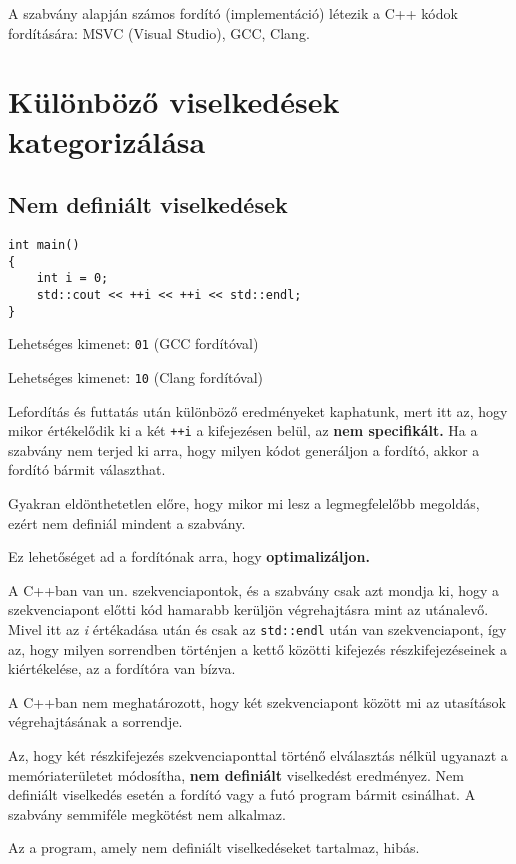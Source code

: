 \documentclass[a4paper,11.5pt]{article}
\begin{document}
	\medskip
  A szabvány alapján számos fordító (implementáció) létezik a C++ kódok fordítására: MSVC (Visual Studio), GCC, Clang.
  \section{Különböző viselkedések kategorizálása} 
	\subsection{Nem definiált viselkedések}
	\begin{lstlisting}
int main()
{
	int i = 0;
	std::cout << ++i << ++i << std::endl;
}
	\end{lstlisting}
	Lehetséges kimenet: \texttt{01} (GCC fordítóval)
	
	Lehetséges kimenet: \texttt{10} (Clang fordítóval)
	\medskip
	
	Lefordítás és futtatás után különböző eredményeket kaphatunk, mert itt az, hogy mikor értékelődik ki a két \texttt{++i} a kifejezésen belül, az \textbf{nem specifikált.} Ha a szabvány nem terjed ki arra, hogy milyen kódot generáljon a fordító, akkor a fordító bármit választhat. 
	\medskip
	
	Gyakran eldönthetetlen előre, hogy mikor mi lesz a legmegfelelőbb megoldás, ezért nem definiál mindent a szabvány.
	\medskip
	
	Ez lehetőséget ad a fordítónak arra, hogy \textbf{optimalizáljon.} 
	\medskip
	
	A C++ban van un. szekvenciapontok, és a szabvány csak azt mondja ki, hogy a szekvenciapont előtti kód hamarabb kerüljön végrehajtásra mint az utánalevő.  Mivel itt az \textit{i} értékadása után és csak az \texttt{std::endl} után van szekvenciapont, így az, hogy milyen sorrendben történjen a kettő közötti kifejezés részkifejezéseinek a kiértékelése, az a fordítóra van bízva.
	\medskip
	
	A C++ban nem meghatározott, hogy két szekvenciapont között mi az utasítások végrehajtásának a sorrendje.
	
	\medskip
	Az, hogy két részkifejezés szekvenciaponttal történő elválasztás nélkül ugyanazt a memóriaterületet módosítha, \textbf{nem definiált} viselkedést eredményez. Nem definiált viselkedés esetén a fordító vagy a futó program bármit csinálhat. A szabvány semmiféle megkötést nem alkalmaz.
	\begin{note}
		Az a program, amely nem definiált viselkedéseket tartalmaz, hibás.
	\end{note}
\end{document}

